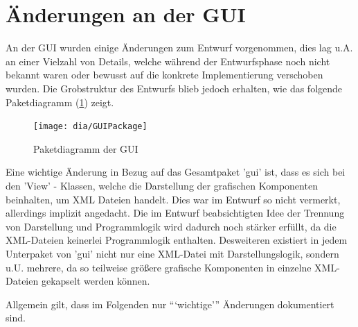 \section{Änderungen an der GUI}
An der GUI wurden einige Änderungen zum Entwurf vorgenommen, dies lag u.A. an einer Vielzahl von Details, welche während der Entwurfsphase noch nicht bekannt waren oder bewusst auf die konkrete Implementierung verschoben wurden. 
Die Grobstruktur des Entwurfs blieb jedoch erhalten, wie das folgende Paketdiagramm (\ref{fig:GUI}) zeigt.
\begin{figure}[h!]
	\centering
	\texttt{[image: dia/GUIPackage]}
	\caption{Paketdiagramm der GUI}
	\label{fig:GUI}
\end{figure}

Eine wichtige Änderung in Bezug auf das Gesamtpaket 'gui' ist, dass es sich bei den 'View' - Klassen, welche die Darstellung der grafischen Komponenten beinhalten, um XML Dateien handelt. Dies war im Entwurf so nicht vermerkt, allerdings implizit angedacht. Die im Entwurf beabsichtigten Idee der Trennung von Darstellung und Programmlogik wird dadurch noch stärker erfüllt, da die XML-Dateien keinerlei Programmlogik enthalten. Desweiteren existiert in jedem Unterpaket von 'gui' nicht nur eine XML-Datei mit Darstellungslogik, sondern u.U. mehrere, da so teilweise größere grafische Komponenten in einzelne XML-Dateien gekapselt werden können.
	
Allgemein gilt, dass im Folgenden nur ```wichtige''' Änderungen dokumentiert sind.

